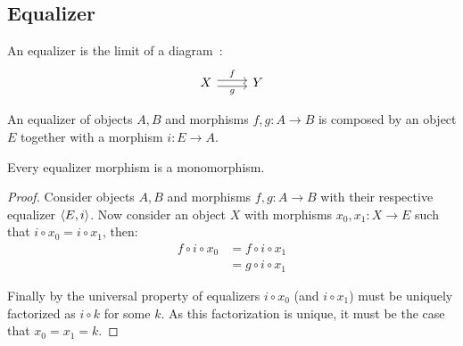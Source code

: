 \subsection{Equalizer}

\begin{definition}[Equalizer]
  An equalizer is the limit of a
  diagram~\parencite[p.~112]{leinster:basic_category_theory}:
  \[\begin{tikzcd}[ampersand replacement=\&]
    X \& Y
    \arrow["f", shift left=1, from=1-1, to=1-2]
    \arrow["g"', shift right=1, from=1-1, to=1-2]
  \end{tikzcd}\]
\end{definition}

\begin{remark}
  An equalizer of objects $A, B$ and morphisms $f, g: A\to B$ is composed by an
  object $E$ together with a morphism $i:E\to A$.
\end{remark}

\begin{theorem}\label{thm:equalizer_mono}
  Every equalizer morphism is a monomorphism.

  \begin{proof}
    Consider objects $A, B$ and morphisms $f, g: A\to B$ with their respective
    equalizer $\langle E, i\rangle$. Now consider an object $X$ with morphisms $x_0, x_1: X
    \to E$ such that $i\circ x_0 = i\circ x_1$, then:
    \[
      \begin{aligned}
        f \circ i \circ x_0
        &= f \circ i \circ x_1\\
        &= g \circ i \circ x_1
      \end{aligned}
    \]

    Finally by the universal property of equalizers $i\circ x_0$ (and $i\circ
    x_1$) must be uniquely factorized as $i\circ k$ for some $k$. As this
    factorization is unique, it must be the case that $x_0 = x_1 = k$.
  \end{proof}
\end{theorem}

